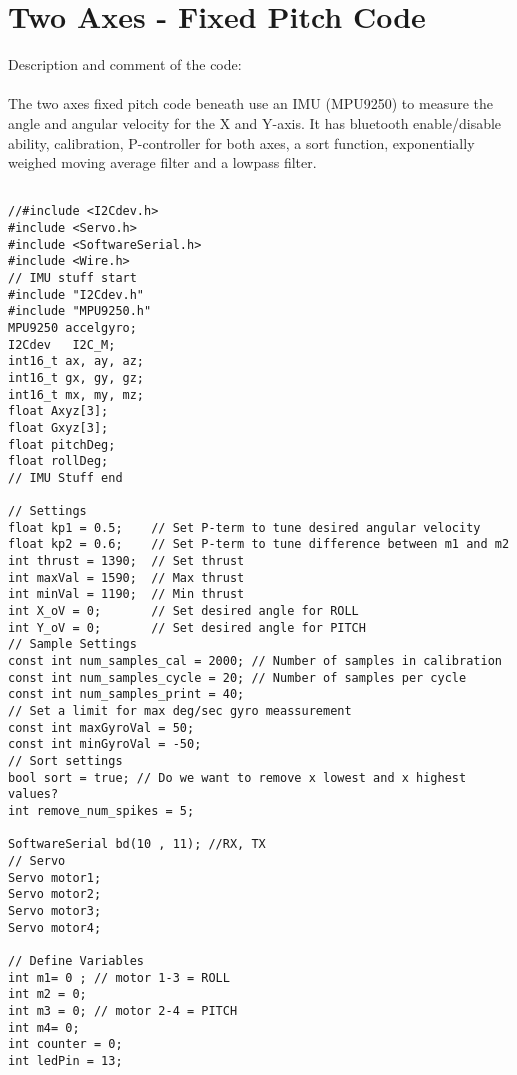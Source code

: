 \section{Two Axes - Fixed Pitch Code}

Description and comment of the code: \\
\\
The two axes fixed pitch code beneath use an IMU (MPU9250) to measure the angle and angular velocity for the X and Y-axis. It has bluetooth enable/disable ability, calibration, P-controller for both axes, a sort function, exponentially weighed moving average filter and a lowpass filter. 

\begin{lstlisting}

//#include <I2Cdev.h>
#include <Servo.h>
#include <SoftwareSerial.h>
#include <Wire.h>
// IMU stuff start
#include "I2Cdev.h"
#include "MPU9250.h"
MPU9250 accelgyro;
I2Cdev   I2C_M;
int16_t ax, ay, az;
int16_t gx, gy, gz;
int16_t mx, my, mz;
float Axyz[3];
float Gxyz[3];
float pitchDeg;
float rollDeg;
// IMU Stuff end
 
// Settings
float kp1 = 0.5;    // Set P-term to tune desired angular velocity
float kp2 = 0.6;    // Set P-term to tune difference between m1 and m2
int thrust = 1390;  // Set thrust
int maxVal = 1590;  // Max thrust
int minVal = 1190;  // Min thrust
int X_oV = 0;       // Set desired angle for ROLL
int Y_oV = 0;       // Set desired angle for PITCH
// Sample Settings
const int num_samples_cal = 2000; // Number of samples in calibration
const int num_samples_cycle = 20; // Number of samples per cycle
const int num_samples_print = 40;
// Set a limit for max deg/sec gyro meassurement
const int maxGyroVal = 50;
const int minGyroVal = -50;
// Sort settings
bool sort = true; // Do we want to remove x lowest and x highest values?
int remove_num_spikes = 5;
 
SoftwareSerial bd(10 , 11); //RX, TX
// Servo
Servo motor1;
Servo motor2;
Servo motor3;
Servo motor4;
 
// Define Variables
int m1= 0 ; // motor 1-3 = ROLL
int m2 = 0;
int m3 = 0; // motor 2-4 = PITCH
int m4= 0;
int counter = 0;
int ledPin = 13;
 

\end{lstlisting}
